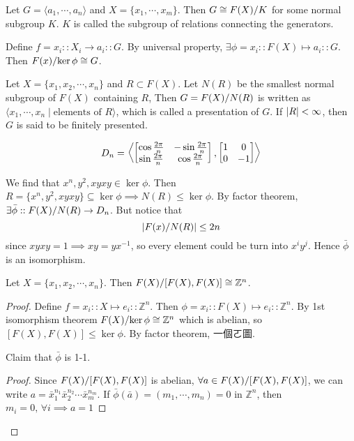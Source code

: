 \begin{prop}
  Let $G = \langle a_1, \cdots , a_n \rangle$ and $X = \{ x_1, \cdots, x_m \}$. Then
  $G \cong \quot{F(X)}{K}$ for some normal subgroup $K$. $K$ is called the subgroup of relations
  connecting the generators.

  Define $f = x_i :: X_i \to a_i :: G$. By universal property, $\exists \phi
  = x_i :: F(X) \mapsto a_i :: G$. Then
  $\quot{F(x)}{\ker \phi} \cong G$.
\end{prop}

\begin{definition}
  Let $X = \{x_1, x_2, \cdots, x_n\}$ and $R \subset F(X)$.
  Let $N(R)$ be the smallest normal subgroup of $F(X)$ containing $R$,
  Then $G = \quot{F(X)}{N(R)}$ is written as $\langle x_1, \cdots, x_n \mid \text{elements of } R \rangle$,
  which is called a presentation of $G$. If $\abs{R} < \infty$, then $G$ is said to be finitely
  presented.
\end{definition}

\begin{example}
  \[ D_n = \gen*{
    \begin{bmatrix}
      \cos \frac{2\pi}{n} & -\sin \frac{2\pi}{n} \\
      \sin \frac{2\pi}{n} &  \cos \frac{2\pi}{n}
    \end{bmatrix},
    \begin{bmatrix}
      1 & 0 \\
      0 & -1
    \end{bmatrix}
    }
  \]

  We find that $x^n , y^2 , xyxy \in \ker \phi$. Then $R = \{ x^n , y^2 , xyxy \} \subseteq \ker \phi
  \implies N(R) \leq \ker \phi$.  By factor theorem, $\exists \bar{\phi} :: \quot{F(X)}{N(R)} \to D_n$.
  But notice that
  \[ \abs*{\quot{F(x)}{N(R)}}  \leq 2n \]
  since $xyxy = 1 \implies xy = yx^{-1}$, so every element could be turn into
  $x^i y^j$. Hence $\bar{\phi}$ is an isomorphism.
\end{example}

\begin{prop}
  Let $X = \{x_1, x_2, \cdots, x_n\}$. Then $\quot{F(X)}{[F(X), F(X)]} \cong \mathbb{Z}^n$.
\end{prop}

\begin{proof}
  Define $f = x_i :: X \mapsto e_i :: \mathbb{Z}^n$. Then $\phi = x_i :: F(X) \mapsto e_i :: \mathbb{Z}^n$.
  By 1st isomorphism theorem $\quot{F(X)}{\ker \phi} \cong \mathbb{Z}^n$ which is abelian,
  so $[F(X), F(X)] \leq \ker \phi$.
  By factor theorem, 一個ㄛ圖.

  Claim that $\bar{\phi}$ is 1-1.
  \begin{proof}
    Since $\quot{F(X)}{[F(X), F(X)]}$ is abelian, $\forall a \in \quot{F(X)}{[F(X), F(X)]}$, we can write
    $a = \bar{x}_1^{n_1} \bar{x}_2^{n_2} \cdots \bar{x}_m^{n_m}$.
    If $\bar{\phi}(\bar{a}) = (m_1, \cdots, m_n) = 0$ in $\mathbb{Z}^n$, then $m_i = 0,\, \forall i
    \implies a = 1$
  \end{proof}
\end{proof}
